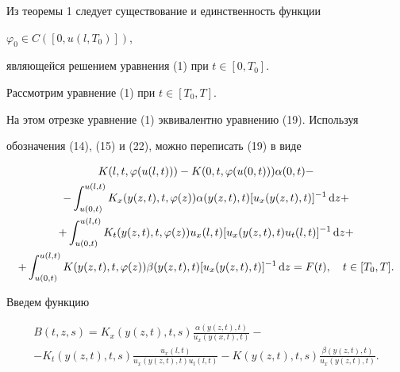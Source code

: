 \begin{pf}


Из теоремы 1 следует существование и единственность функции


$\varphi_0 \in C([0,u(l,T_0)])$,


являющейся решением уравнения (1) при $t\in [0,T_0] $.





Рассмотрим уравнение (1) при $t\in [T_0,T]$.


На этом отрезке уравнение (1) эквивалентно уравнению (19). Используя


обозначения (14), (15) и (22), можно переписать (19) в виде


\begin{multline}


K(l,t,\varphi (u(l,t)))-K(0,t,\varphi (u(0,t)))\alpha


(0,t)-\\


-\int_{u(0,t)}^{u(l,t)}K_x(y(z,t),t,\varphi (z))\alpha


(y(z,t),t)


[u_x(y(z,t),t)]^{-1}\d z+\\


+\int_{u(0,t)}^{u(l,t)}K_t(y(z,t),t,\varphi


(z))u_x(l,t) [u_x(y(z,t),t)u_t(l,t)]^{-1}\d z+\\


+\int_{u(0,t)}^{u(l,t)}K(y(z,t),t,\varphi


(z))\beta (y(z,t),t) [u_x(y(z,t),t)]^{-1}\d z=F(t),\q


t\in [T_0,T].




\end{multline}


Введем функцию


\begin{multline}


B(t,z,s) = K_x(y(z,t),t,s)\frac{\alpha


(y(z,t),t)}{u_x(y(x,t),t)}-\\


-K_t(y(z,t),t,s)\frac{u_x(l,t)}{u_x(y(z,t),t)u_t(l,t)}-


K(y(z,t),t,s)


\frac{\beta (y(z,t),t)}{u_x(y(z,t),t)}.




\end{multline}



\end{pf}
